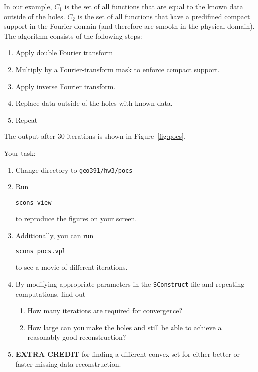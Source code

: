 In our example, $C_1$ is the set of all functions that are equal to
the known data outside of the holes. $C_2$ is the set of all functions
that have a predifined compact support in the Fourier domain (and
therefore are smooth in the physical domain). The algorithm consists
of the following steps:
\begin{enumerate}
\item Apply double Fourier transform 
\item Multiply by a Fourier-transform mask to enforce compact support.
\item Apply inverse Fourier transform.
\item Replace data outside of the holes with known data.
\item Repeat
\end{enumerate}
The output after 30 iterations is shown in Figure~\ref{fig:pocs}.


\lstset{language=python,numbers=left,numberstyle=\tiny,showstringspaces=false}


Your task:
\begin{enumerate}
\item Change directory to \verb#geo391/hw3/pocs#
\item Run 
\begin{verbatim}
scons view
\end{verbatim}
to reproduce the figures on your screen.
\item Additionally, you can run
\begin{verbatim}
scons pocs.vpl
\end{verbatim}
to see a movie of different iterations.
\item By modifying appropriate parameters in the \texttt{SConstruct} file and repeating computations,
find out
\begin{enumerate}
\item How many iterations are required for convergence?
\item How large can you make the holes and still be able to achieve a reasonably good reconstruction?
\end{enumerate}
\item \textbf{EXTRA CREDIT} for finding a different convex set for either better or faster missing data reconstruction.
\end{enumerate}

